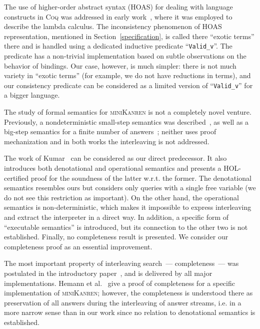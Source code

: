 The use of higher-order abstract syntax (HOAS) for dealing with language constructs in \textsc{Coq} was addressed in early work~\cite{HOASinCoq},
where it was employed to describe the lambda calculus. The inconsistency phenomenon of HOAS representation, mentioned in Section~\ref{specification}, is called
there ``exotic terms'' there and is handled using a dedicated inductive predicate ``\lstinline|Valid_v|''. The predicate has a non-trivial implementation based
on subtle observations on the behavior of bindings. Our case, however, is much simpler: there is not much variety in ``exotic terms'' (for example, we do not have
reductions in terms), and our consistency predicate can be considered as a limited version of ``\lstinline|Valid_v|'' for a bigger language.

The study of formal semantics for \textsc{miniKanren} is not a completely novel venture. Previously, a nondeterministic
small-step semantics was described~\cite{RelConversion}, as well as a big-step semantics for a finite number of answers~\cite{DivTest};
neither uses proof mechanization and in both works the interleaving is not addressed. 

The work of Kumar~\cite{MechanisingMiniKanren} can be considered as our direct predecessor. It also introduces both denotational and
operational semantics and presents a \textsc{HOL}-certified proof for the soundness of the latter w.r.t. the former. The denotational
semantics resembles ours but considers only queries with a single free variable (we do not see this restriction as important).
On the other hand, the operational semantics is non-deterministic, which makes it
impossible to express interleaving and extract the interpreter in a direct way. In addition, a specific form of ``executable semantics''
is introduced, but its connection to the other two is not established. Finally, no completeness result is presented.
We consider our completeness proof as an essential improvement. 

The most important property of interleaving search~--- completeness~--- was postulated in the introductory paper~\cite{Search}, and is delivered by
all major implementations. Hemann et al.~\cite{SmallEmbedding} give a proof of completeness for a specific implementation of \textsc{miniKanren};
however, the completeness is understood there as
preservation of all answers during the interleaving of answer streams, i.e. in a more narrow sense than in our work since no relation
to denotational semantics is established.
